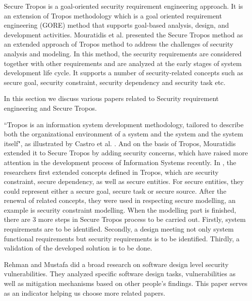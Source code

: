 \documentclass{acm_proc_article-sp}
\begin{document}
Secure Tropos is a goal-oriented security requirement engineering approach. It is an extension of Tropos methodology which is a goal oriented requirement engineering (GORE) method that supports goal-based analysis, design, and development activities. Mouratidis et al. \cite{Mouratidis06securetropos:} presented the Secure Tropos method as an extended approach of Tropos method to address the challenges of security analysis and modeling. In this method, the security requirements are considered together with other requirements and are analyzed at the early stages of system development life cycle. It supports a number of security-related concepts such as secure goal, security constraint, security dependency and security task etc.

In this section we discuss various papers related to Security requirement engineering and Secure Tropos.
\par
``Tropos is an information system development methodology, tailored to describe both the organizational environment of a system and the system and the system itself", as illustrated by Castro et al. \cite{Jaelson01}. And on the basis of Tropos, Mouratidis extended it to Secure Tropos by adding security concerns, which have raised more attention in the development process of Information Systems recently.
In \cite{Jaelson01}, the researchers first extended concepts defined in Tropos, which are security constraint, secure dependency, as well as secure entities. For secure entities, they could represent either a secure goal, secure task or secure source. After the renewal of related concepts, they were used in respecting secure modelling, an example is security constraint modelling. When the modelling part is finished, there are 3 more steps in Secure Tropos process to be carried out. Firstly, system requirements are to be identified. Secondly, a design meeting not only system functional requirements but security requirements is to be identified. Thirdly, a validation of the developed solution is to be done.
\par
Rehman and Mustafa did a broad research on software design level security vulnerabilities\cite{Rehman:2009:RSD:1640162.1640171}. They analyzed specific software design tasks, vulnerabilities as well as mitigation mechanisms based on other people's findings. This paper serves as an indicator helping us choose more related papers. %
\par
\end{document}
